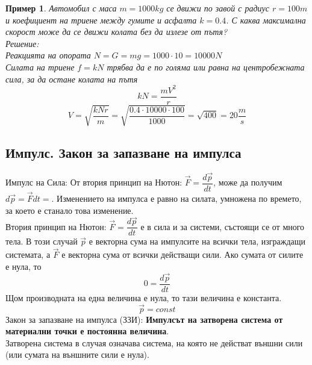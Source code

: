\documentclass[fleqn, 12pt]{article}
\newtheorem{example}{Пример}[subsection]
\begin{document}
\begin{example}
Автомобил с маса $m = 1000 kg$ се движи по завой с радиус $r = 100 m$ и коефициент на триене между гумите и асфалта $k =0.4$. С каква максимална скорост може да се движи колата без да излезе от пътя?\\
Решение: \\
Реакцията на опората $N = G = mg = 1000 \cdot 10 = 10 000 N$\\
Силата на триене $f = kN$ трябва да е по голяма или равна на центробежната сила, за да остане колата на пътя 
$$kN =  \dfrac{mV^2}{r}$$
$$V = \sqrt{\dfrac{kNr}{m}} = \sqrt{\dfrac{0.4 \cdot 10 000 \cdot 100}{1000}} = \sqrt{400} = 20 \dfrac{m}{s}$$
\end{example}


\subsection{Импулс. Закон за запазване на импулса}

Импулс на Сила: От втория принцип на Нютон: $\vec{F} = \dfrac{d \vec{p}}{dt}$, може да получим $d \vec{p} =\vec{F}dt =$. Изменението на импулса е равно на силата, умножена по времето, за което е станало това изменение. \\
Втория принцип на Нютон: $\vec{F} = \dfrac{d \vec{p}}{dt}$ е в сила и за системи, състоящи се от много тела. В този случай $\vec{p}$ е векторна сума на импулсите на всички тела, изграждащи системата, а $\vec{F}$ е векторна сума от всички действащи сили. Ако сумата от силите е нула, то
$$0 = \dfrac{d \vec{p}}{dt}$$
Щом производната на една величина е нула, то тази величина е константа.
$$\vec{p} = const$$
Закон за запазване на импулса (ЗЗИ): \textbf{Импулсът на затворена система от материални точки е постоянна величина}.\\ 
Затворена система в случая означава система, на която не действат външни сили (или сумата на външните сили е нула).
\end{document}
